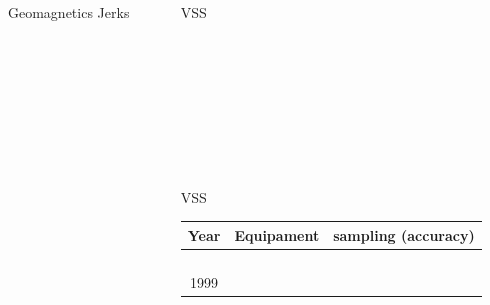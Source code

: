 \documentclass[final,t]{beamer}
\begin{document}
\begin{columns}[t]
\begin{column}{.66\linewidth}
\begin{columns}
\begin{column}{.31\linewidth}
\begin{block}{Geomagnetics Jerks}
		
		
		
		
		
	\end{block}
\end{column}	

\end{columns}

\end{column}
\begin{column}{.33\linewidth}


\begin{block}{VSS}
	\justifying
\begin{tabbing}
	\hspace{}\=\hspace{}\=\kill
	\>  \> \\ 
	\>  \> \\ 
	\>  \> \\ 
	\>  \> \\ 
	\>  \> \\ 
	\>  \> \\
	\>  \> \\

	\>  \> 
\end{tabbing} 





\end{block}

\begin{block}{VSS}
	\centering
\begin{tabular}{|c|c|c|}
	\hline Year & Equipament & sampling (accuracy) \\ 
	\hline  &  &  \\ 
	\hline  &  &  \\ 
	\hline  &  &  \\ 
	\hline  &  &  \\ 
	\hline 1999  &  &  \\ 
	\hline 
\end{tabular} 
	
	
	
	
	
\end{block}



\end{column}
\end{columns}
\end{document}
